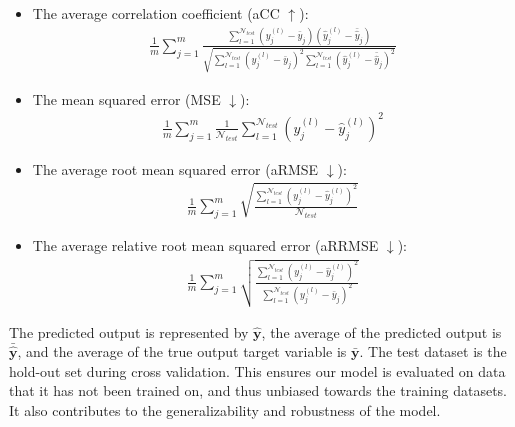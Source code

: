 \documentclass[reqno]{vcuthesis}
\numberwithin{equation}{chapter}
\begin{document}
\begin{itemize}
\item The average correlation coefficient (aCC $\uparrow$):
\begin{eqnarray}
\frac{1}{m} \sum_{j = 1}^m \frac{\sum_{l = 1}^{\mathcal N_{test}} (y_j^{(l)} - \bar{y}_j)(\hat{y}_j^{(l)} - \bar{\hat{y}}_j)}{\sqrt{\sum_{l = 1}^{\mathcal N_{test}} (y_j^{(l)} - \bar{y}_j)^2 \sum_{l = 1}^{\mathcal N_{test}} (\hat{y}_j^{(l)} - \bar{\hat{y}}_j)^2}}
\label{eqn:aCC}
\end{eqnarray}

\item The mean squared error (MSE $\downarrow$):
\begin{eqnarray}
\frac{1}{m} \sum_{j = 1}^m \frac{1}{\mathcal N_{test}} \sum_{l = 1}^{\mathcal N_{test}} (y_j^{(l)} - \hat{y}^{(l)}_j)^2
\label{eqn:MSE}
\end{eqnarray}

\item The average root mean squared error (aRMSE $\downarrow$):
\begin{eqnarray}
\frac{1}{m} \sum_{j = 1}^m \sqrt{\frac{\sum_{l = 1}^{\mathcal N_{test}} (y_j^{(l)} - \hat{y}^{(l)}_j)^2}{\mathcal N_{test}}}
\label{eqn:armse}
\end{eqnarray}

\item The average relative root mean squared error (aRRMSE $\downarrow$):
\begin{eqnarray}
\frac{1}{m} \sum_{j = 1}^m \sqrt{\frac{\sum_{l = 1}^{\mathcal N_{test}} (y_j^{(l)} - \hat{y}_j^{(l)})^2}{\sum_{l = 1}^{\mathcal N_{test}} (y_j^{(l)} - \bar{y}_j)^2}}
\label{eqn:arrmse}
\end{eqnarray}
\end{itemize}

The predicted output is represented by $\hat{\textbf{y}}$, the average of the predicted output is $\bar{\hat{\textbf{y}}}$, and the average of the true output target variable is $\bar{\textbf{y}}$. The test dataset is the hold-out set during cross validation. This ensures our model is evaluated on data that it has not been trained on, and thus unbiased towards the training datasets. It also contributes to the generalizability and robustness of the model.
\end{document}
